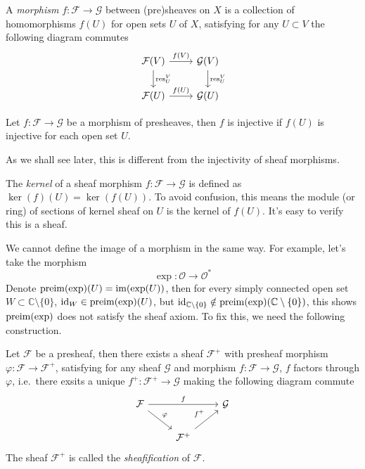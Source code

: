 \begin{defn}
    A \emph{morphism} $f:\mathcal{F}\to\mathcal{G}$ between (pre)sheaves on $X$ is a collection of homomorphisms $f(U)$ for open sets $U$ of $X$, satisfying for any $U\subset V$ the following diagram commutes
    \[\begin{tikzcd}
        \mathcal{F}(V)\ar[r,"f(V)"]\ar[d,"\res^V_U"] & \mathcal{G}(V)\ar[d,"\res^V_U"]\\
        \mathcal{F}(U)\ar[r,"f(U)"] & \mathcal{G}(U)
    \end{tikzcd}\]
\end{defn}

\begin{defn}
    Let $f:\mathcal{F}\to\mathcal{G}$ be a morphism of presheaves, then $f$ is injective if $f(U)$ is injective for each open set $U$.
\end{defn}

\begin{rem}
    As we shall see later, this is different from the injectivity of sheaf morphisms.
\end{rem}

\begin{defn}
    The \emph{kernel} of a sheaf morphism $f:\mathcal{F}\to\mathcal{G}$ is defined as $\ker(f)(U)=\ker(f(U))$.
    To avoid confusion, this means the module (or ring) of sections of kernel sheaf on $U$ is the kernel of $f(U)$.
    It's easy to verify this is a sheaf.
\end{defn}

\begin{eg}
    We cannot define the image of a morphism in the same way.
    For example, let's take the morphism
    \[\exp:\mathcal{O}\to\mathcal{O}^*\]
    Denote $\operatorname{preim}(\exp)(U)=\operatorname{im}(\exp(U))$, then for every simply connected open set $W\subset\mathbb{C}\setminus\{0\}$, $\mathrm{id}_W\in\operatorname{preim}(\exp)(U)$, but $\mathrm{id}_{\mathbb{C}\setminus\{0\}}\notin\operatorname{preim}(\exp)(\mathbb{C}\setminus\{0\})$, this shows $\operatorname{preim}(\exp)$ does not satisfy the sheaf axiom.
    To fix this, we need the following construction.
\end{eg}

\begin{defn}
    Let $\mathcal{F}$ be a presheaf, then there exists a sheaf $\mathcal{F}^+$ with presheaf morphism $\varphi:\mathcal{F}\to\mathcal{F}^+$, satisfying for any sheaf $\mathcal{G}$ and morphism $f:\mathcal{F}\to\mathcal{G}$, $f$ factors through $\varphi$, i.e.\ there exsits a unique $f^+:\mathcal{F}^+\to\mathcal{G}$ making the following diagram commute
    \[\begin{tikzcd}
        \mathcal{F} \ar[rr, "f"] \ar[dr, "\varphi"] & & \mathcal{G} \\
        {} & \mathcal{F}^+\ar[ur, "f^+"] & {}
    \end{tikzcd}\]
    The sheaf $\mathcal{F}^+$ is called the \emph{sheafification} of $\mathcal{F}$.
\end{defn}


